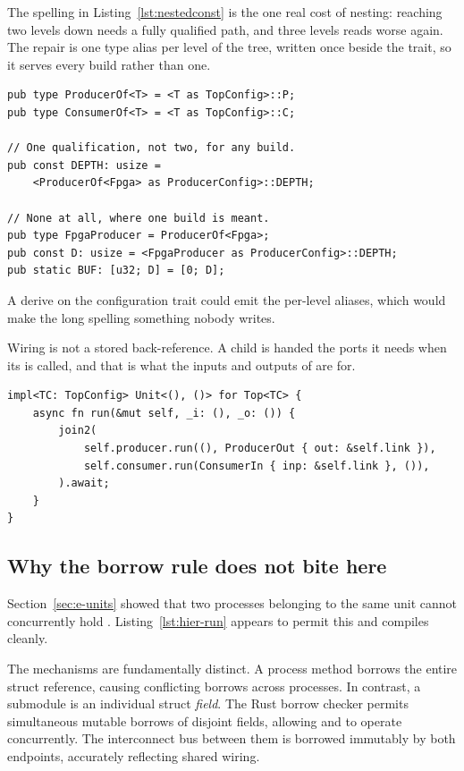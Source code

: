 The spelling in Listing~\ref{lst:nestedconst} is the one real cost of
nesting: reaching two levels down needs a fully qualified path, and three
levels reads worse again. The repair is one type alias per level of the
tree, written once beside the trait, so it serves every build rather than
one.

\begin{lstlisting}[caption={The repair. A generic alias per level, and a per-build alias where one build is being talked about. Both compile in probe~17.},label={lst:nestedalias}]
pub type ProducerOf<T> = <T as TopConfig>::P;
pub type ConsumerOf<T> = <T as TopConfig>::C;

// One qualification, not two, for any build.
pub const DEPTH: usize =
    <ProducerOf<Fpga> as ProducerConfig>::DEPTH;

// None at all, where one build is meant.
pub type FpgaProducer = ProducerOf<Fpga>;
pub const D: usize = <FpgaProducer as ProducerConfig>::DEPTH;
pub static BUF: [u32; D] = [0; D];
\end{lstlisting}

A derive on the configuration trait could emit the per-level aliases,
which would make the long spelling something nobody writes.

Wiring is not a stored back-reference. A child is handed the ports it
needs when its  is called, and that is what the inputs and
outputs of  are for.

\begin{lstlisting}[caption={Instantiating two submodules and wiring them. Both children receive the same bus; neither holds a reference to the other.},label={lst:hier-run}]
impl<TC: TopConfig> Unit<(), ()> for Top<TC> {
    async fn run(&mut self, _i: (), _o: ()) {
        join2(
            self.producer.run((), ProducerOut { out: &self.link }),
            self.consumer.run(ConsumerIn { inp: &self.link }, ()),
        ).await;
    }
}
\end{lstlisting}

\subsection{Why the borrow rule does not bite here}

Section~\ref{sec:e-units} showed that two processes belonging to the
same unit cannot concurrently hold . Listing~\ref{lst:hier-run}
appears to permit this and compiles cleanly.

The mechanisms are fundamentally distinct. A process method borrows the
entire struct reference, causing conflicting borrows across processes. In
contrast, a submodule is an individual struct \emph{field}. The Rust borrow
checker permits simultaneous mutable borrows of disjoint fields, allowing
 and  to operate
concurrently. The interconnect bus between them is borrowed immutably by
both endpoints, accurately reflecting shared wiring.

